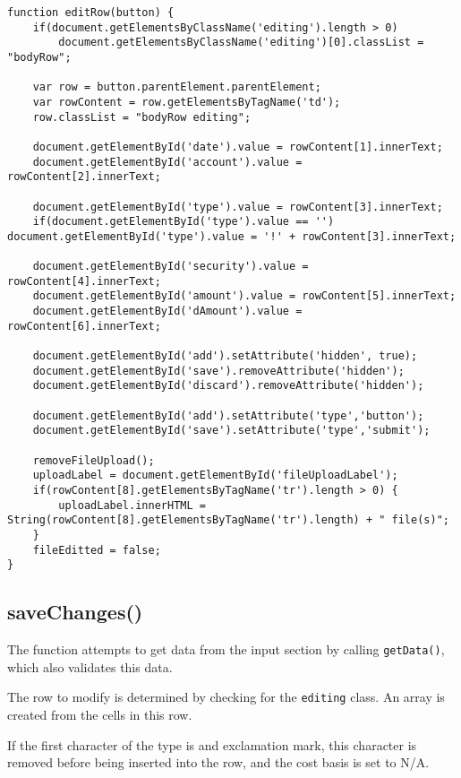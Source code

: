 \documentclass[letterpaper]{article}
\begin{document}
\begin{lstlisting}[firstnumber=268]
function editRow(button) {
    if(document.getElementsByClassName('editing').length > 0)
        document.getElementsByClassName('editing')[0].classList = "bodyRow";

    var row = button.parentElement.parentElement;
    var rowContent = row.getElementsByTagName('td');
    row.classList = "bodyRow editing";

    document.getElementById('date').value = rowContent[1].innerText;
    document.getElementById('account').value = rowContent[2].innerText;

    document.getElementById('type').value = rowContent[3].innerText;
    if(document.getElementById('type').value == '') document.getElementById('type').value = '!' + rowContent[3].innerText;

    document.getElementById('security').value = rowContent[4].innerText;
    document.getElementById('amount').value = rowContent[5].innerText;
    document.getElementById('dAmount').value = rowContent[6].innerText;

    document.getElementById('add').setAttribute('hidden', true);
    document.getElementById('save').removeAttribute('hidden');
    document.getElementById('discard').removeAttribute('hidden');

    document.getElementById('add').setAttribute('type','button');
    document.getElementById('save').setAttribute('type','submit');

    removeFileUpload();
    uploadLabel = document.getElementById('fileUploadLabel');
    if(rowContent[8].getElementsByTagName('tr').length > 0) {
        uploadLabel.innerHTML = String(rowContent[8].getElementsByTagName('tr').length) + " file(s)";
    }
    fileEditted = false;
}
\end{lstlisting}

\subsection{saveChanges()}

The function attempts to get data from the input section by calling \lstinline{getData()}, which also validates this data.

The row to modify is determined by checking for the \lstinline{editing} class.
An array is created from the cells in this row.

If the first character of the type is and exclamation mark, this character is removed before being inserted into the row, and the cost basis is set to N/A.
\end{document}
